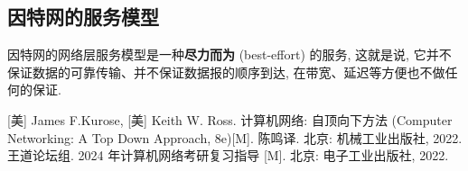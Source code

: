 \documentclass[10pt,UTF8]{book} %
\begin{document}
\subsection{因特网的服务模型}

因特网的网络层服务模型是一种\textbf{尽力而为} (best-effort) 的服务, 这就是说,
它并不保证数据的可靠传输、并不保证数据报的顺序到达, 在带宽、延迟等方便也不做任何的保证.



\begin{thebibliography}{1}
    [美] James F.Kurose, [美] Keith W. Ross. 计算机网络: 自顶向下方法
    (Computer Networking: A Top Down Approach, 8e)[M]. 
    陈鸣译. 北京: 机械工业出版社, 2022.
    王道论坛组. 2024 年计算机网络考研复习指导 [M]. 北京: 电子工业出版社, 2022.
\end{thebibliography}


\end{document}
